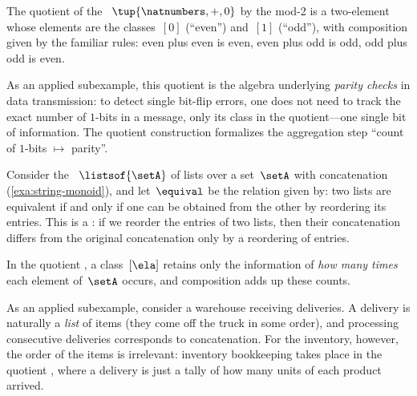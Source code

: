 \begin{example}
    \label{exa:parity-quotient}
    The quotient of the ~$\tup{\natnumbers, +, 0}$ by the mod-2  is a two-element  whose elements are the classes~$[0]$ (``even'') and~$[1]$ (``odd''), with composition given by the familiar rules: even plus even is even, even plus odd is odd, odd plus odd is even.

    As an applied subexample, this quotient is the algebra underlying \emph{parity checks} in data transmission: to detect single bit-flip errors, one does not need to track the exact number of $1$-bits in a message, only its class in the quotient---one single bit of information.
    The quotient construction formalizes the aggregation step ``count of $1$-bits $\mapsto$ parity''.
\end{example}

\begin{example}
    \label{exa:multiset-quotient}
    Consider the ~$\listsof{\setA}$ of lists over a set~$\setA$ with concatenation (\cref{exa:string-monoid}), and let~$\equival$ be the relation given by: two lists are equivalent if and only if one can be obtained from the other by reordering its entries.
    This is a : if we reorder the entries of two lists, then their concatenation differs from the original concatenation only by a reordering of entries.

    In the quotient , a class~$[\ela]$ retains only the information of \emph{how many times} each element of~$\setA$ occurs, and composition adds up these counts.

    As an applied subexample, consider a warehouse receiving deliveries.
    A delivery is naturally a \emph{list} of items (they come off the truck in some order), and processing consecutive deliveries corresponds to concatenation.
    For the inventory, however, the order of the items is irrelevant: inventory bookkeeping takes place in the quotient , where a delivery is just a tally of how many units of each product arrived.
\end{example}

